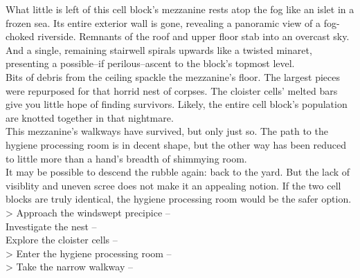 What little is left of this cell block’s mezzanine rests atop the fog like an islet in a frozen sea. Its entire exterior wall is gone, revealing a panoramic view of a fog-choked riverside. Remnants of the roof and upper floor stab into an overcast sky. And a single, remaining stairwell spirals upwards like a twisted minaret, presenting a possible--if perilous--ascent to the block’s topmost level.\\

Bits of debris from the ceiling spackle the mezzanine's floor. The largest pieces were repurposed for that horrid nest of corpses. The cloister cells’ melted bars give you little hope of finding survivors. Likely, the entire cell block's population are knotted together in that nightmare.\\

This mezzanine's walkways have survived, but only just so. The path to the hygiene processing room is in decent shape, but the other way has been reduced to little more than a hand's breadth of shimmying room.\\

It may be possible to descend the rubble again: back to the yard. But the lack of visiblity and uneven scree does not make it an appealing notion. If the two cell blocks are truly identical, the hygiene processing room would be the safer option.\\

> Approach the windswept precipice -- \\
 Investigate the nest -- \\
 Explore the cloister cells -- \\
> Enter the hygiene processing room -- \\
> Take the narrow walkway -- 